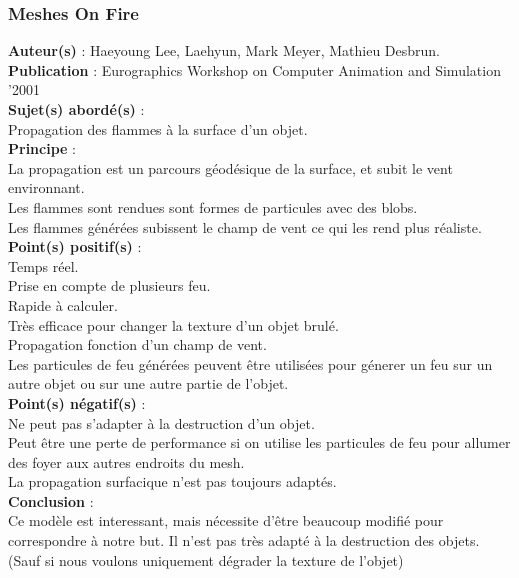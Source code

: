 \documentclass[a4paper,10pt]{article}
\begin{document}
\subsubsection{Meshes On Fire}
\textbf{Auteur(s)} : Haeyoung Lee, Laehyun, Mark Meyer, Mathieu Desbrun.\\
\textbf{Publication} : Eurographics Workshop on Computer Animation and Simulation '2001 \\
\textbf{Sujet(s) abordé(s)} : \\
	Propagation des flammes à la surface d'un objet.\\
\textbf{Principe} : \\
	La propagation est un parcours géodésique de la surface, et subit le vent environnant.\\	
	Les flammes sont rendues sont formes de particules avec des blobs.\\
	Les flammes générées subissent le champ de vent ce qui les rend plus réaliste.\\
\textbf{Point(s) positif(s)} :\\
	Temps réel.\\
	Prise en compte de plusieurs feu.\\
	Rapide à calculer.\\
	Très efficace pour changer la texture d'un objet brulé.\\
	Propagation fonction d'un champ de vent.\\
	Les particules de feu générées peuvent être utilisées pour génerer un feu 
	sur un autre objet ou sur une autre partie de l'objet.\\
\textbf{Point(s) négatif(s)} :\\
	Ne peut pas s'adapter à la destruction d'un objet.\\
	Peut être une perte de performance si on utilise les particules de feu pour 
	allumer des foyer aux autres endroits du mesh.\\
	La propagation surfacique n'est pas toujours adaptés.\\	
\textbf{Conclusion} :\\
	Ce modèle est interessant, mais nécessite d'être beaucoup modifié pour 
	correspondre à notre but. Il n'est pas très adapté à la destruction des objets. 
	(Sauf si nous voulons uniquement dégrader la texture de l'objet) \\
\end{document}
